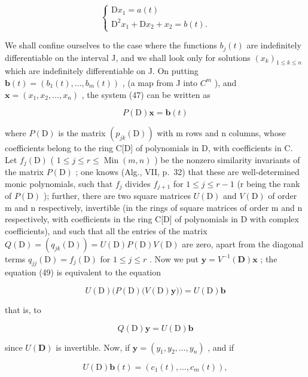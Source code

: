 \[
\left\{ \begin{array}{c} \mathrm{D} x _ {1} = a (t) \\ \mathrm{D} ^ {2} x _ {1} + \mathrm{D} x _ {2} + x _ {2} = b (t). \end{array} \right.\tag{48}
\]

We shall confine ourselves to the case where the functions \(b_{j}(t)\) are indefinitely differentiable on the interval J, and we shall look only for solutions \((x_{k})_{1\leqslant k\leqslant n}\) which are indefinitely differentiable on J. On putting \(\mathbf{b}(t)=\left(b_{1}(t),\ldots,b_{m}(t)\right)\) , (a map from J into \(C^{m}\) ), and \(\mathbf{x}=\left(x_{1},x_{2},\ldots,x_{n}\right)\) , the system (47) can be written as

\[
P (\mathrm{D}) \mathbf {x} = \mathbf {b} (t)\tag{49}
\]

where \(P(\mathrm{D})\) is the matrix \((p_{jk}(\mathrm{D}))\) with m rows and n columns, whose coefficients belong to the ring C{[}D{]} of polynomials in D, with coefficients in C. Let \(f_{j}(\mathrm{D})\) ( \(1 \leqslant j \leqslant r \leqslant \operatorname{Min}(m, n)\) ) be the nonzero similarity invariants of the matrix \(P(\mathrm{D})\) ; one knows (Alg., VII, p.~32) that these are well-determined monic polynomials, such that \(f_{j}\) divides \(f_{j+1}\) for \(1 \leqslant j \leqslant r - 1\) (r being the rank of \(P(\mathrm{D})\) ); further, there are two square matrices \(U(\mathrm{D})\) and \(V(\mathrm{D})\) of order m and n respectively, invertible (in the rings of square matrices of order m and n respectively, with coefficients in the ring C{[}D{]} of polynomials in D with complex coefficients), and such that all the entries of the matrix \(Q(\mathrm{D}) = (q_{jk}(\mathrm{D})) = U(\mathrm{D}) P(\mathrm{D}) V(\mathrm{D})\) are zero, apart from the diagonal terms \(q_{jj}(\mathrm{D}) = f_{j}(\mathrm{D})\) for \(1 \leqslant j \leqslant r\) . Now we put \(\mathbf{y} = V^{-1}(\mathbf{D})\mathbf{x}\) ; the equation (49) is equivalent to the equation

\[
U (\mathrm{D}) \big (P (\mathrm{D}) \big (V (\mathrm{D}) \mathbf {y} \big) \big) = U (\mathrm{D}) \mathbf {b}
\]

that is, to

\[
Q (\mathrm{D}) \mathbf {y} = U (\mathrm{D}) \mathbf {b}\tag{50}
\]

since \(U(\mathbf{D})\) is invertible. Now, if \(\mathbf{y} = (y_1, y_2, \ldots, y_n)\) , and if

\[
U (\mathrm{D}) \mathbf {b} (t) = \left(c _ {1} (t), \dots , c _ {m} (t)\right),
\]

